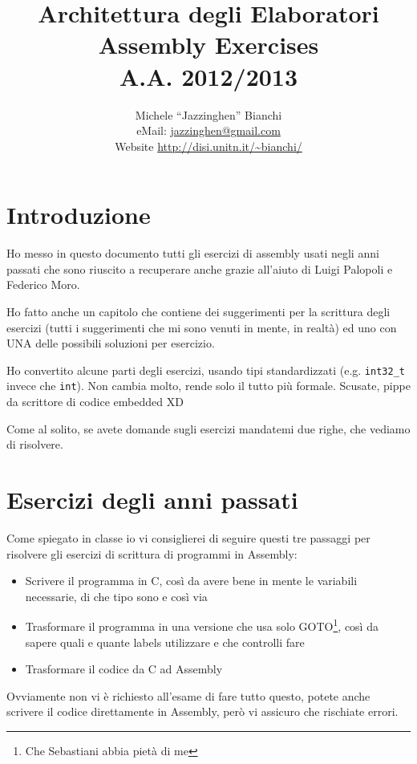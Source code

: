 \documentclass[a4paper]{memoir}
\title{Architettura degli Elaboratori \\ Assembly Exercises \\ A.A. 2012/2013}
\author{Michele ``Jazzinghen'' Bianchi \\ eMail: \url{jazzinghen@gmail.com} \\%
	Website \url{http://disi.unitn.it/~bianchi/}}
\begin{document}
\maketitle

\chapter*{Introduzione}

  Ho messo in questo documento tutti gli esercizi di assembly usati negli anni passati che sono riuscito
  a recuperare anche grazie all'aiuto di Luigi Palopoli e Federico Moro.
  
  Ho fatto anche un capitolo che contiene dei suggerimenti per la scrittura degli esercizi (tutti i suggerimenti
  che mi sono venuti in mente, in realtà) ed uno con UNA delle possibili soluzioni per esercizio.
  
  Ho convertito alcune parti degli esercizi, usando tipi standardizzati (e.g. {\color{myorange}\texttt{int32\_t}}
  invece che {\color{myorange}\texttt{int}}). Non cambia
  molto, rende solo il tutto più formale. Scusate, pippe da scrittore di codice embedded XD
  
  Come al solito, se avete domande sugli esercizi mandatemi due righe, che vediamo di risolvere.
  
\chapter{Esercizi degli anni passati}
	
	Come spiegato in classe io vi consiglierei di seguire questi tre passaggi per risolvere gli esercizi di scrittura
	di programmi in Assembly:
	
	\begin{itemize}
    \item Scrivere il programma in C, così da avere bene in mente le variabili necessarie, di che tipo sono e così via
    \item Trasformare il programma in una versione che usa solo GOTO\footnote{Che Sebastiani abbia pietà di me}, così da sapere
      quali e quante labels utilizzare e che controlli fare
    \item Trasformare il codice da C ad Assembly
	\end{itemize}
	
	Ovviamente non vi è richiesto all'esame di fare tutto questo, potete anche scrivere il codice direttamente in Assembly,
	però vi assicuro che rischiate errori.
	
\end{document}
